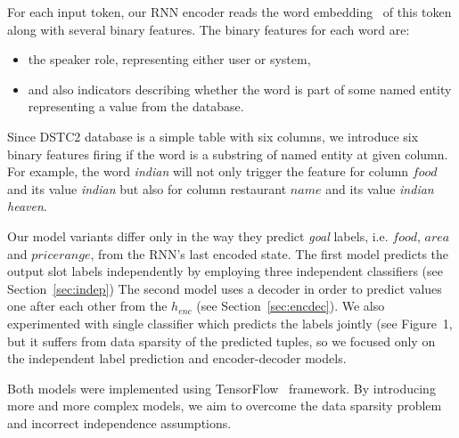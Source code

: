\documentclass{itatnew}
\begin{document}
For each input token, our RNN encoder reads the word embedding~\cite{bengio2003neural} of this token along with several binary features. 
The binary features for each word are:
\begin{itemize}
	\item the speaker role, representing either user or system,
    \item and also indicators describing whether the word is part of some named entity representing a value from the database.
\end{itemize}
  
Since DSTC2 database is a simple table with six columns, we introduce six binary features firing if the word is a substring of named entity at given column.
For example, the word {\it indian} will not only trigger the feature for column $food$ and its value {\it indian} but also for column restaurant $name$ and its value {\it indian heaven}.

Our model variants differ only in the way they predict {\it goal} labels, i.e. $food$, $area$ and $price range$, from the RNN's last encoded state.
The first model predicts the output slot labels independently by employing three independent classifiers (see Section~\ref{sec:indep})
The second model uses a decoder in order to predict values one after each other from the $h_{enc}$ (see Section~\ref{sec:encdec}).
We also experimented with single classifier which predicts the labels jointly (see Figure~1, but it suffers from data sparsity of the predicted tuples, so we focused only on the independent label prediction and encoder-decoder models.

Both models were implemented using TensorFlow~\cite{abaditensorflow} framework. By introducing more and more complex models, we aim to overcome the data sparsity problem and incorrect independence assumptions.
\end{document}
